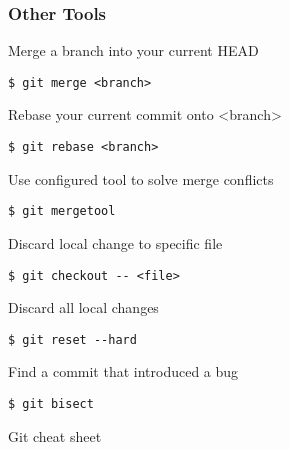 \begin{multicols}{2}
\subsubsection*{Other Tools}
Merge a branch into your current HEAD
\begin{lstlisting}
$ git merge <branch>
\end{lstlisting}
Rebase your current commit onto <branch>
\begin{lstlisting}
$ git rebase <branch>
\end{lstlisting}
Use configured tool to solve merge conflicts
\begin{lstlisting}
$ git mergetool
\end{lstlisting}
Discard local change to specific file
\begin{lstlisting}
$ git checkout -- <file>
\end{lstlisting}
Discard all local changes
\begin{lstlisting}
$ git reset --hard
\end{lstlisting}
Find a commit that introduced a bug
\begin{lstlisting}
$ git bisect
\end{lstlisting}

\end{multicols}

\begin{center} Git cheat sheet
\end{center}

\endgroup
